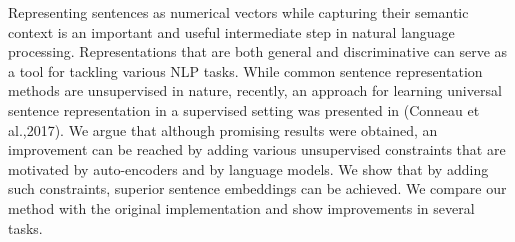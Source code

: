 Representing sentences as numerical vectors while capturing their semantic context is an important and useful intermediate step in natural language processing. Representations that are both general and discriminative can serve as a tool for tackling various NLP tasks. While common sentence representation methods are unsupervised in nature, recently, an approach for learning universal sentence representation in a supervised setting was presented in (Conneau et al.,2017). We argue that although promising results were obtained, an improvement can be reached by adding various unsupervised constraints that are motivated by auto-encoders and by language models. We show that by adding such constraints, superior sentence embeddings can be achieved. We compare our method with the original implementation and show improvements in several tasks.
